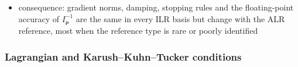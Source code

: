 \begin{itemize}
        same eigenvalues; the ALR map \(\boldsymbol{A}_{r}=\boldsymbol{D}_{r}\mathbf{V}\) has \(J-2\) singular values equal to \(1\) and
        one equal to \(\sqrt{J}\), along the log-abundance of the reference \(\mathbf{V}^{\top}\boldsymbol{e}_{r}\), so
        \(\kappa(\mathbf{H}_{\boldsymbol{\rho}})/J\le\kappa(\boldsymbol{A}_{r}^{-\top}\mathbf{H}_{\boldsymbol{\rho}}\boldsymbol{A}_{r}^{-1})\le J\,\kappa(\mathbf{H}_{\boldsymbol{\rho}})\)
  \item consequence: gradient norms, damping, stopping rules and the floating-point accuracy of
        \(I_{\boldsymbol{\rho}}^{-1}\) are the same in every ILR basis but change with the ALR reference, most when the
        reference type is rare or poorly identified
\end{itemize}

\subsubsection{Lagrangian and Karush--Kuhn--Tucker conditions}
\label{app:kkt}

